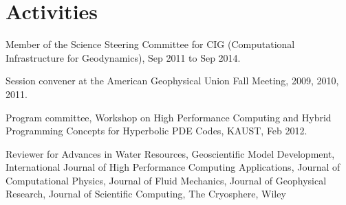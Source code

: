 \documentclass[10pt,letterpaper]{article}
\renewenvironment{itemize}{
  \begin{list}{}{
    \setlength{\leftmargin}{1.5em}
    \setlength{\itemsep}{0.25em}
    \setlength{\parskip}{0pt}
    \setlength{\parsep}{0.25em}
  }
}{
  \end{list}
}
\begin{document}
\section*{Activities}
\begin{itemize}
\item Member of the Science Steering Committee for CIG (Computational Infrastructure for Geodynamics), Sep 2011 to Sep 2014.
\item Session convener at the American Geophysical Union Fall Meeting, 2009, 2010, 2011.
\item Program committee, Workshop on High Performance Computing and Hybrid Programming Concepts for Hyperbolic PDE Codes, KAUST, Feb 2012.
\item Reviewer for
  Advances in Water Resources,
  Geoscientific Model Development,
  International Journal of High Performance Computing Applications,
  Journal of Computational Physics,
  Journal of Fluid Mechanics,
  Journal of Geophysical Research,
  Journal of Scientific Computing,
  The Cryosphere,
  Wiley
\end{itemize}


\end{document}
